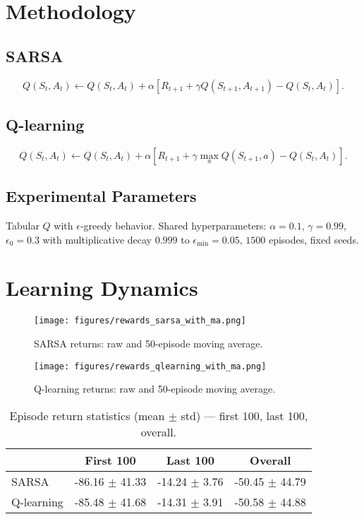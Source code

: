 \documentclass[11pt]{article}
\begin{document}
\section{Methodology}
\subsection{SARSA}
\begin{equation}
Q(S_t,A_t) \leftarrow Q(S_t,A_t) + \alpha \left[ R_{t+1} + \gamma Q(S_{t+1},A_{t+1}) - Q(S_t,A_t) \right].
\end{equation}

\subsection{Q-learning}
\begin{equation}
Q(S_t,A_t) \leftarrow Q(S_t,A_t) + \alpha \left[ R_{t+1} + \gamma \max_a Q(S_{t+1},a) - Q(S_t,A_t) \right].
\end{equation}

\subsection{Experimental Parameters}
Tabular $Q$ with $\epsilon$-greedy behavior. Shared hyperparameters: $\alpha=0.1$, $\gamma=0.99$, $\epsilon_0=0.3$ with multiplicative decay $0.999$ to $\epsilon_{\min}=0.05$, $1500$ episodes, fixed seeds.

\section{Learning Dynamics}
\begin{figure}[H]
  \centering
  \texttt{[image: figures/rewards\_sarsa\_with\_ma.png]}
  \caption{SARSA returns: raw and 50-episode moving average.}
  \label{fig:sarsa_ma}
\end{figure}

\begin{figure}[H]
  \centering
  \texttt{[image: figures/rewards\_qlearning\_with\_ma.png]}
  \caption{Q-learning returns: raw and 50-episode moving average.}
  \label{fig:q_ma}
\end{figure}

\begin{table}[H]
\centering
\caption{Episode return statistics (mean $\pm$ std) — first 100, last 100, overall.}
\label{tab:stats}
\begin{tabular}{lccc}
\toprule
 & First 100 & Last 100 & Overall \\
\midrule
SARSA & -86.16 $\pm$ 41.33 & -14.24 $\pm$ 3.76 & -50.45 $\pm$ 44.79 \\
Q-learning & -85.48 $\pm$ 41.68 & -14.31 $\pm$ 3.91 & -50.58 $\pm$ 44.88 \\
\bottomrule
\end{tabular}
\end{table}
\end{document}
